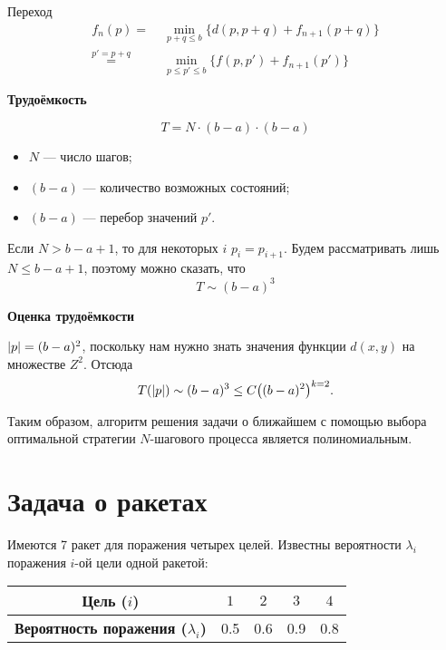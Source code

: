 Переход
\begin{align*}
	f_n(p) =& \; \min_{p+q \le b} \{d(p, p + q) + f_{n+1}(p+q)\} \\
	\stackrel{p' = p + q}{=}& \; \min_{p \le p' \le b} \{f(p, p') + f_{n+1}(p')\}	
\end{align*}

\bigskip

\textbf{Трудоёмкость}

\[
T = N \cdot (b - a) \cdot (b - a)
\]

\begin{itemize}[nosep]
	\item $N$ --- число шагов;
	
	\item $(b-a)$ --- количество возможных состояний;
	
	\item $(b-a)$ --- перебор значений $p'$.
\end{itemize}

Если $N > b - a + 1$, то для некоторых $i$ $p_i = p_{i+1}$. Будем рассматривать лишь $N \le b - a + 1$, поэтому можно сказать, что
\[
T \sim (b - a)^3
\]

\bigskip

\textbf{Оценка трудоёмкости}

$\abs{p} = (b - a)^2$, поскольку нам нужно знать значения функции $d(x, y)$ на множестве $Z^2$. Отсюда
\[
T(\abs{p}) \sim (b - a)^3 \le C \big((b-a)^2\big)^{k=2}.
\]

Таким образом, алгоритм решения задачи о ближайшем с помощью выбора оптимальной стратегии $N$-шагового процесса является полиномиальным.

\section{Задача о ракетах}

\problem[о ракетах]

Имеются 7 ракет для поражения четырех целей. Известны вероятности $\lambda_i$ поражения $i$-ой цели одной ракетой: 

\begin{table}[H]
	\centering
	\begin{tabular}{| c | c | c | c | c |} 
		\hline
		\textbf{Цель ($i$)}             & $1$ & $2$ & $3$ & $4$ \\\hline
		\textbf{Вероятность поражения ($\lambda_i$)}              &0.5   & 0.6   & 0.9   & 0.8 \\\hline
	\end{tabular}
\end{table}

